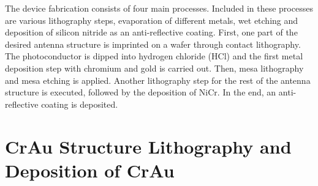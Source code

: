 The device fabrication consists of four main processes. Included in these processes are various lithography steps, evaporation of different metals, wet etching and deposition of silicon nitride as an anti-reflective coating. First, one part of the desired antenna structure is imprinted on a wafer through contact lithography. The photoconductor is dipped into hydrogen chloride (HCl) and the first metal deposition step with chromium and gold is carried out. Then, mesa lithography and mesa etching is applied. Another lithography step for the rest of the antenna structure is executed, followed by the deposition of NiCr. In the end, an anti-reflective coating is deposited. 

\section{CrAu Structure Lithography and Deposition of CrAu}

